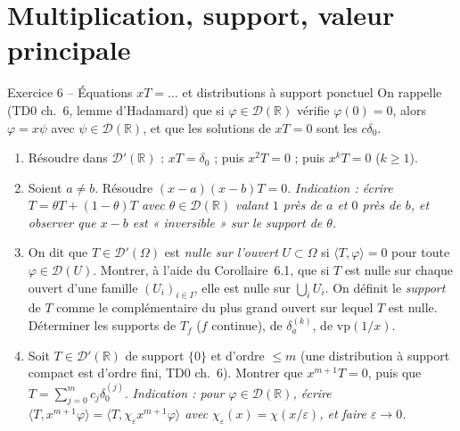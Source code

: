 \documentclass[11pt,a4paper]{article}
\newcommand{\R}{\mathbb{R}}
\newcommand{\D}{\mathcal{D}}
\theoremstyle{definition}
\begin{document}
\section*{Multiplication, support, valeur principale}

\begin{exo}{Exercice 6 -- Équations $xT=\dots$ et distributions à support ponctuel}
On rappelle (TD0 ch.~6, lemme d'Hadamard) que si $\varphi\in\D(\R)$ vérifie $\varphi(0)=0$, alors $\varphi=x\psi$ avec $\psi\in\D(\R)$, et que les solutions de $xT=0$ sont les $c\delta_0$.
\begin{enumerate}[label=(\alph*)]
  \item Résoudre dans $\D'(\R)$ : $xT=\delta_0$ ; puis $x^2T=0$ ; puis $x^kT=0$ ($k\ge1$).
  \item Soient $a\ne b$. Résoudre $(x-a)(x-b)T=0$. \emph{Indication : écrire $T=\theta T+(1-\theta)T$ avec $\theta\in\D(\R)$ valant $1$ près de $a$ et $0$ près de $b$, et observer que $x-b$ est « inversible » sur le support de $\theta$.}
  \item On dit que $T\in\D'(\Omega)$ est \emph{nulle sur l'ouvert} $U\subset\Omega$ si $\langle T,\varphi\rangle=0$ pour toute $\varphi\in\D(U)$. Montrer, à l'aide du Corollaire~6.1, que si $T$ est nulle sur chaque ouvert d'une famille $(U_i)_{i\in I}$, elle est nulle sur $\bigcup_iU_i$. On définit le \emph{support} de $T$ comme le complémentaire du plus grand ouvert sur lequel $T$ est nulle. Déterminer les supports de $T_f$ ($f$ continue), de $\delta_a^{(k)}$, de $\mathrm{vp}(1/x)$.
  \item Soit $T\in\D'(\R)$ de support $\{0\}$ et d'ordre $\le m$ (une distribution à support compact est d'ordre fini, TD0 ch.~6). Montrer que $x^{m+1}T=0$, puis que $T=\sum_{j=0}^mc_j\delta_0^{(j)}$. \emph{Indication : pour $\varphi\in\D(\R)$, écrire $\langle T,x^{m+1}\varphi\rangle=\langle T,\chi_\varepsilon x^{m+1}\varphi\rangle$ avec $\chi_\varepsilon(x)=\chi(x/\varepsilon)$, et faire $\varepsilon\to0$.}
\end{enumerate}
\end{exo}
\end{document}
